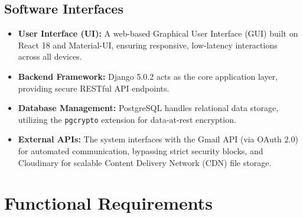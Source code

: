 \subsection{Software Interfaces}
\begin{itemize}
    \item \textbf{User Interface (UI):} A web-based Graphical User Interface (GUI) built on React 18 and Material-UI, ensuring responsive, low-latency interactions across all devices.
    \item \textbf{Backend Framework:} Django 5.0.2 acts as the core application layer, providing secure RESTful API endpoints.
    \item \textbf{Database Management:} PostgreSQL handles relational data storage, utilizing the \texttt{pgcrypto} extension for data-at-rest encryption.
    \item \textbf{External APIs:} The system interfaces with the Gmail API (via OAuth 2.0) for automated communication, bypassing strict security blocks, and Cloudinary for scalable Content Delivery Network (CDN) file storage.
\end{itemize}

\section{Functional Requirements}

